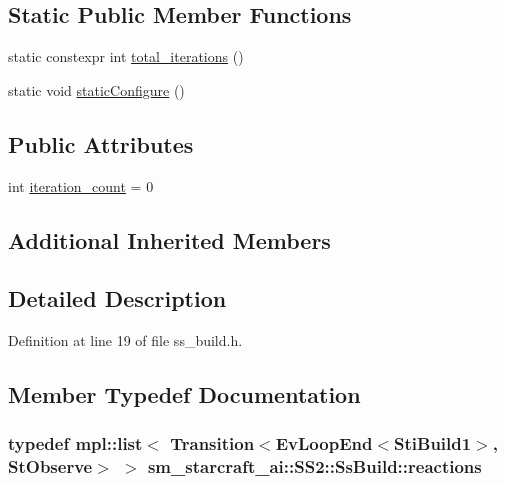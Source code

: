 \subsection*{Static Public Member Functions}
\begin{DoxyCompactItemize}
\item 
static constexpr int \hyperlink{structsm__starcraft__ai_1_1SS2_1_1SsBuild_a2f1a89dd07833fdcec8e3a80b1b8af86}{total\+\_\+iterations} ()
\item 
static void \hyperlink{structsm__starcraft__ai_1_1SS2_1_1SsBuild_ae3e7448868c67c307e71f04a04e08139}{static\+Configure} ()
\end{DoxyCompactItemize}
\subsection*{Public Attributes}
\begin{DoxyCompactItemize}
\item 
int \hyperlink{structsm__starcraft__ai_1_1SS2_1_1SsBuild_abd2de17a6f6647b5c3da117b4ac7d02b}{iteration\+\_\+count} = 0
\end{DoxyCompactItemize}
\subsection*{Additional Inherited Members}


\subsection{Detailed Description}


Definition at line 19 of file ss\+\_\+build.\+h.



\subsection{Member Typedef Documentation}
\subsubsection[{\texorpdfstring{reactions}{reactions}}]{\setlength{\rightskip}{0pt plus 5cm}typedef mpl\+::list$<$ Transition$<$Ev\+Loop\+End$<${\bf Sti\+Build1}$>$, {\bf St\+Observe}$>$ $>$ {\bf sm\+\_\+starcraft\+\_\+ai\+::\+S\+S2\+::\+Ss\+Build\+::reactions}}\hypertarget{structsm__starcraft__ai_1_1SS2_1_1SsBuild_a62244400be4af9006d440fb0f099dcc5}{}\label{structsm__starcraft__ai_1_1SS2_1_1SsBuild_a62244400be4af9006d440fb0f099dcc5}


